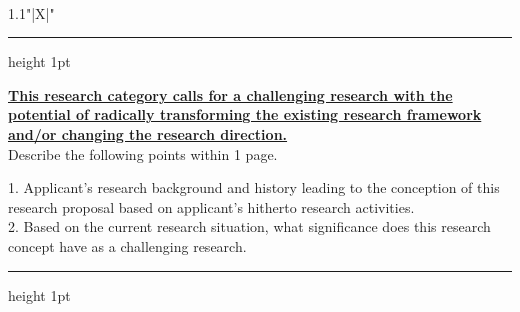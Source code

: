 \documentclass[8pt]{extarticle}
\makeatletter
\newcommand{\thickhline}{%
	\noalign {\ifnum 0=`}\fi \hrule height 1pt
	\futurelet \reserved@a \@xhline
}
\makeatother
\begin{document}
	
\noindent\textbf{\fontsize{12}{12}\selectfont {} }\\
\begin{tabularx}{1.1\linewidth}{"|X|"}
	\thickhline
	\underline{\textbf{This research category calls for a challenging research with the potential of radically transforming the existing research framework}}\\
	\underline{\textbf{and/or changing the research direction.}}\\
	
	Describe the following points within 1 page.
	
	1. Applicant's research background and history leading to the conception of this research proposal based on applicant’s hitherto research activities.\\
	2. Based on the current research situation, what significance does this research concept have as a challenging research.
	\\
	\thickhline
\end{tabularx}
\end{document}
